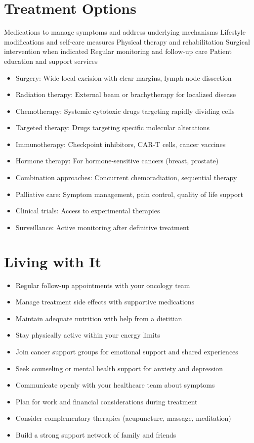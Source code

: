 \section{Treatment Options}
Medications to manage symptoms and address underlying mechanisms Lifestyle modifications and self-care measures Physical therapy and rehabilitation Surgical intervention when indicated Regular monitoring and follow-up care Patient education and support services

\begin{itemize}[noitemsep]
  \item Surgery: Wide local excision with clear margins, lymph node dissection
  \item Radiation therapy: External beam or brachytherapy for localized disease
  \item Chemotherapy: Systemic cytotoxic drugs targeting rapidly dividing cells
  \item Targeted therapy: Drugs targeting specific molecular alterations
  \item Immunotherapy: Checkpoint inhibitors, CAR-T cells, cancer vaccines
  \item Hormone therapy: For hormone-sensitive cancers (breast, prostate)
  \item Combination approaches: Concurrent chemoradiation, sequential therapy
  \item Palliative care: Symptom management, pain control, quality of life support
  \item Clinical trials: Access to experimental therapies
  \item Surveillance: Active monitoring after definitive treatment
\end{itemize}
\section{Living with It}
\begin{itemize}[noitemsep]
  \item Regular follow-up appointments with your oncology team
  \item Manage treatment side effects with supportive medications
  \item Maintain adequate nutrition with help from a dietitian
  \item Stay physically active within your energy limits
  \item Join cancer support groups for emotional support and shared experiences
  \item Seek counseling or mental health support for anxiety and depression
  \item Communicate openly with your healthcare team about symptoms
  \item Plan for work and financial considerations during treatment
  \item Consider complementary therapies (acupuncture, massage, meditation)
  \item Build a strong support network of family and friends
\end{itemize}
